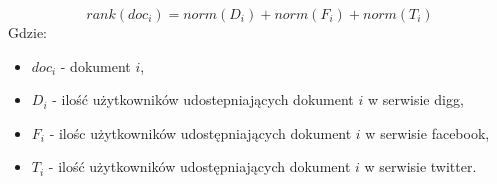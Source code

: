\begin{equation}
rank(doc_i) = norm(D_i) + norm(F_i) + norm(T_i)
\end{equation}
Gdzie:
\begin{itemize}
\item $doc_i$ - dokument $i$,
\item $D_i$ - ilość użytkowników udostepniających dokument $i$ w serwisie digg,
\item $F_i$ - ilośc użytkowników udostępniających dokument $i$ w serwisie facebook,
\item  $T_i$ - ilość użytkowników udostępniających dokument $i$ w serwisie twitter.
\end{itemize}



